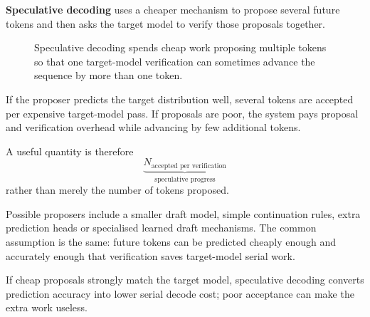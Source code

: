 \textbf{Speculative decoding} uses a cheaper mechanism to propose several future tokens and then asks the target model to verify those proposals together.

\begin{figure}[htbp]
\centering
{}
\caption{Speculative decoding spends cheap work proposing multiple tokens so that one target-model verification can sometimes advance the sequence by more than one token.}
\label{fig:speculative-decoding}
\end{figure}

If the proposer predicts the target distribution well, several tokens are accepted per expensive target-model pass.
If proposals are poor, the system pays proposal and verification overhead while advancing by few additional tokens.

A useful quantity is therefore
\[
\underbrace{N_{\text{accepted per verification}}}_{\text{speculative progress}}
\]
rather than merely the number of tokens proposed.

Possible proposers include a smaller draft model, simple continuation rules, extra prediction heads or specialised learned draft mechanisms.
The common assumption is the same: future tokens can be predicted cheaply enough and accurately enough that verification saves target-model serial work.

\begin{calloutbias}
If cheap proposals strongly match the target model, speculative decoding converts prediction accuracy into lower serial decode cost; poor acceptance can make the extra work useless.
\end{calloutbias}

